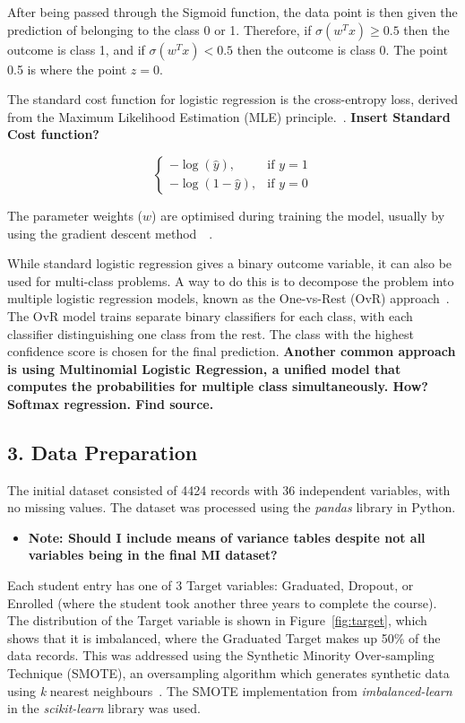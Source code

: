 \documentclass[12pt]{article}
\begin{document}
After being passed through the Sigmoid function, the data point is then given the prediction of belonging to the class 0 or 1. Therefore, if \(\sigma(w^{T}x) \geq 0.5\) then the outcome is class 1, and if \(\sigma(w^{T}x) < 0.5\) then the outcome is class 0. The point 0.5 is where the point \(z = 0\).

The standard cost function for logistic regression is the cross-entropy loss, derived from the Maximum Likelihood Estimation (MLE) principle.~\cite{Li2024}. \textbf{Insert Standard Cost function?}

\[
\begin{cases} 
    -\log(\hat{y}), & \text{if } y = 1 \\
    -\log(1 - \hat{y}), & \text{if } y = 0
\end{cases}
\]

The parameter weights (\(w\)) are optimised during training the model, usually by using the gradient descent method~\cite{Zou2019}~\cite{Li2024}.

While standard logistic regression gives a binary outcome variable, it can also be used for multi-class problems. A way to do this is to decompose the problem into multiple logistic regression models, known as the One-vs-Rest (OvR) approach~\cite{Aly2005}. The OvR model trains separate binary classifiers for each class, with each classifier distinguishing one class from the rest. The class with the highest confidence score is chosen for the final prediction. \textbf{Another common approach is using Multinomial Logistic Regression, a unified model that computes the probabilities for multiple class simultaneously. How? Softmax regression. Find source.}

\newpage
\subsection*{3. Data Preparation}
The initial dataset consisted of 4424 records with 36 independent variables, with no missing values. The dataset was processed using the \textit{pandas} library in Python.

\begin{itemize}
    \item{\textbf{Note: Should I include means of variance tables despite not all variables being in the final MI dataset?}}
\end{itemize}

Each student entry has one of 3 Target variables: Graduated, Dropout, or Enrolled (where the student took another three years to complete the course). The distribution of the Target variable is shown in Figure~\ref{fig:target}, which shows that it is imbalanced, where the Graduated Target makes up 50\% of the data records. This was addressed using the Synthetic Minority Over-sampling Technique (SMOTE), an oversampling algorithm which generates synthetic data using \textit{k} nearest neighbours~\cite{smote}. The SMOTE implementation from \textit{imbalanced-learn} in the \textit{scikit-learn} library was used.
\end{document}
